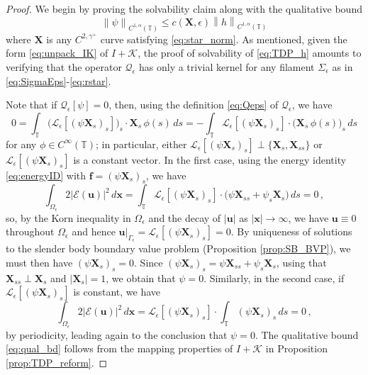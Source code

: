 \documentclass[11pt,reqno]{amsart}
\newcommand{\T}{\mathbb{T}}
\newcommand{\E}{\mathcal{E}}
\newcommand{\bu}{\bm{u}}
\newcommand{\bx}{\bm{x}}
\newcommand{\X}{\bm{X}}
\newcommand{\abs}[1]{\left\lvert #1 \right\rvert}
\newcommand{\norm}[1]{\left\lVert #1 \right\rVert}
\newcommand{\mc}[1]{\mathcal{#1}}
\theoremstyle{definition}
\begin{document}
\begin{proof}
We begin by proving the solvability claim along with the qualitative bound 
\begin{equation}\label{eq:qual_bd}
  \norm{\psi}_{C^{1,\alpha}(\T)}\le c(\X,\epsilon)\norm{h}_{C^{1,\alpha}(\T)}
\end{equation}
where $\X$ is any $C^{2,\gamma^+}$ curve satisfying \eqref{eq:star_norm}.
As mentioned, given the form \eqref{eq:unpack_IK} of $I+\mc{K}$, the proof of solvability of \eqref{eq:TDP_h} amounts to verifying that the operator $\mc{Q}_\epsilon$ has only a trivial kernel for any filament $\Sigma_\epsilon$ as in \eqref{eq:SigmaEps}-\eqref{eq:rstar}.


Note that if $\mc{Q}_\epsilon[\psi]=0$, then, using the definition \eqref{eq:Qeps} of $\mc{Q}_\epsilon$, we have 
\begin{equation}
0= \int_\T \big(\mc{L}_\epsilon[(\psi\X_s)_s]\big)_s\cdot\X_s\,\phi(s)\,ds 
= -\int_\T \mc{L}_\epsilon[(\psi\X_s)_s]\cdot\big(\X_s\,\phi(s)\big)_s\,ds
\end{equation}
for any $\phi\in C^\infty(\T)$; in particular, either $\mc{L}_\epsilon[(\psi\X_s)_s]\perp\{\X_s,\X_{ss}\}$ or $\mc{L}_\epsilon[(\psi\X_s)_s]$ is a constant vector. In the first case, using the energy identity \eqref{eq:energyID} with $\bm{f}=(\psi\X_s)_s$, we have
\begin{equation}
\int_{\Omega_\epsilon}2\abs{\E(\bu)}^2\,d\bx = \int_\T \mc{L}_\epsilon[(\psi\X_s)_s]\cdot \big(\psi\X_{ss}+\psi_s\X_s \big)\,ds =0\,,
\end{equation}
so, by the Korn inequality in $\Omega_\epsilon$ \cite[Lemma 2.6]{closed_loop} and the decay of $\abs{\bu}$ as $\abs{\bx}\to\infty$, we have $\bu\equiv 0$ throughout $\Omega_\epsilon$ and hence $\bu\big|_{\Gamma_\epsilon}=\mc{L}_\epsilon[(\psi\X_s)_s]=0$. By uniqueness of solutions to the slender body boundary value problem (Proposition \ref{prop:SB_BVP}), we must then have $(\psi\X_s)_s=0$. Since $(\psi\X_s)_s=\psi\X_{ss}+\psi_s\X_s$, using that $\X_{ss}\perp\X_s$ and $\abs{\X_s}=1$, we obtain that $\psi=0$. 
%
Similarly, in the second case, if $\mc{L}_\epsilon[(\psi\X_s)_s]$ is constant, we have
\begin{equation}
\int_{\Omega_\epsilon}2\abs{\E(\bu)}^2\,d\bx = \mc{L}_\epsilon[(\psi\X_s)_s]\cdot\int_\T (\psi\X_s)_s\,ds =0\,,
\end{equation}
by periodicity, leading again to the conclusion that $\psi=0$. The qualitative bound \eqref{eq:qual_bd} follows from the mapping properties of $I+\mc{K}$ in Proposition \ref{prop:TDP_reform}.



\end{proof}
\end{document}
